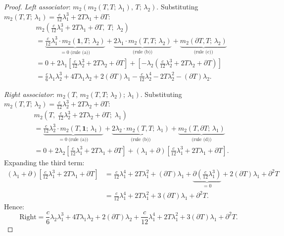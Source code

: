 \begin{proof}
\emph{Left associator}:
$m_2(m_2(T,T;\,\lambda_1),\, T;\, \lambda_2)$.
Substituting $m_2(T,T;\,\lambda_1)
= \frac{c}{12}\lambda_1^3 + 2T\lambda_1 + \partial T$:
\begin{align*}
&m_2\!\left(\frac{c}{12}\lambda_1^3 + 2T\lambda_1
+ \partial T,\; T;\; \lambda_2\right)
\\
&= \underbrace{\frac{c}{12}\lambda_1^3
 \cdot m_2(\mathbf{1},T;\,\lambda_2)}_{= 0\;\text{(rule (a))}}
+ \underbrace{2\lambda_1 \cdot m_2(T,T;\,\lambda_2)}_{\text{(rule (b))}}
+ \underbrace{m_2(\partial T, T;\,\lambda_2)}_{\text{(rule (c))}}
\\
&= 0
+ 2\lambda_1\!\left[\frac{c}{12}\lambda_2^3 + 2T\lambda_2
+ \partial T\right]
+ \left[-\lambda_2\!\left(\frac{c}{12}\lambda_2^3 + 2T\lambda_2
+ \partial T\right)\right]
\\
&= \frac{c}{6}\lambda_1\lambda_2^3 + 4T\lambda_1\lambda_2
+ 2(\partial T)\lambda_1
- \frac{c}{12}\lambda_2^4 - 2T\lambda_2^2
- (\partial T)\lambda_2.
\end{align*}

\emph{Right associator}:
$m_2(T,\, m_2(T,T;\,\lambda_2);\, \lambda_1)$.
Substituting $m_2(T,T;\,\lambda_2)
= \frac{c}{12}\lambda_2^3 + 2T\lambda_2 + \partial T$:
\begin{align*}
&m_2\!\left(T,\; \frac{c}{12}\lambda_2^3 + 2T\lambda_2
+ \partial T;\; \lambda_1\right)
\\
&= \underbrace{\frac{c}{12}\lambda_2^3
 \cdot m_2(T,\mathbf{1};\,\lambda_1)}_{= 0\;\text{(rule (a))}}
+ \underbrace{2\lambda_2
 \cdot m_2(T,T;\,\lambda_1)}_{\text{(rule (b))}}
+ \underbrace{m_2(T,\partial T;\,\lambda_1)}_{\text{(rule (d))}}
\\
&= 0
+ 2\lambda_2\!\left[\frac{c}{12}\lambda_1^3 + 2T\lambda_1
+ \partial T\right]
+ (\lambda_1 + \partial)\!\left[\frac{c}{12}\lambda_1^3
+ 2T\lambda_1 + \partial T\right].
\end{align*}
Expanding the third term:
\begin{align*}
(\lambda_1 + \partial)\!\left[\frac{c}{12}\lambda_1^3
+ 2T\lambda_1 + \partial T\right]
&= \frac{c}{12}\lambda_1^4 + 2T\lambda_1^2
+ (\partial T)\lambda_1
+ \underbrace{\partial\!\left(\frac{c}{12}\lambda_1^3\right)}_{= 0}
+ 2(\partial T)\lambda_1 + \partial^2 T
\\
&= \frac{c}{12}\lambda_1^4 + 2T\lambda_1^2
+ 3(\partial T)\lambda_1 + \partial^2 T.
\end{align*}
Hence:
\[
\text{Right}
= \frac{c}{6}\lambda_2\lambda_1^3 + 4T\lambda_1\lambda_2
+ 2(\partial T)\lambda_2
+ \frac{c}{12}\lambda_1^4 + 2T\lambda_1^2
+ 3(\partial T)\lambda_1 + \partial^2 T.
\]


\end{proof}

